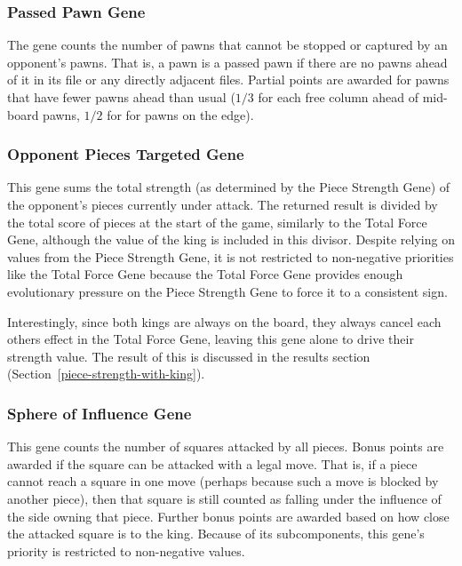 \documentclass[letterpaper]{article}
\renewcommand{\_}{\allowbreak\textunderscore\allowbreak}
\begin{document}
\subsubsection{Passed Pawn Gene}
The gene counts the number of pawns that cannot be stopped or captured by an opponent's pawns. That is, a pawn is a passed pawn if there are no pawns ahead of it in its file or any directly adjacent files. Partial points are awarded for pawns that have fewer pawns ahead than usual (\(1/3\) for each free column ahead of mid-board pawns, \(1/2\) for for pawns on the edge).

\subsubsection{Opponent Pieces Targeted Gene}\label{opponent-pieces-targeted}
This gene sums the total strength (as determined by the Piece Strength Gene) of the opponent's pieces currently under attack. The returned result is divided by the total score of pieces at the start of the game, similarly to the Total Force Gene, although the value of the king is included in this divisor. Despite relying on values from the Piece Strength Gene, it is not restricted to non-negative priorities like the Total Force Gene because the Total Force Gene provides enough evolutionary pressure on the Piece Strength Gene to force it to a consistent sign.

Interestingly, since both kings are always on the board, they always cancel each others effect in the Total Force Gene, leaving this gene alone to drive their strength value. The result of this is discussed in the results section (Section~\ref{piece-strength-with-king}).

\subsubsection{Sphere of Influence Gene}
This gene counts the number of squares attacked by all pieces. Bonus points are awarded if the square can be attacked with a legal move. That is, if a piece cannot reach a square in one move (perhaps because such a move is blocked by another piece), then that square is still counted as falling under the influence of the side owning that piece. Further bonus points are awarded based on how close the attacked square is to the king. Because of its subcomponents, this gene's priority is restricted to non-negative values.
\end{document}
